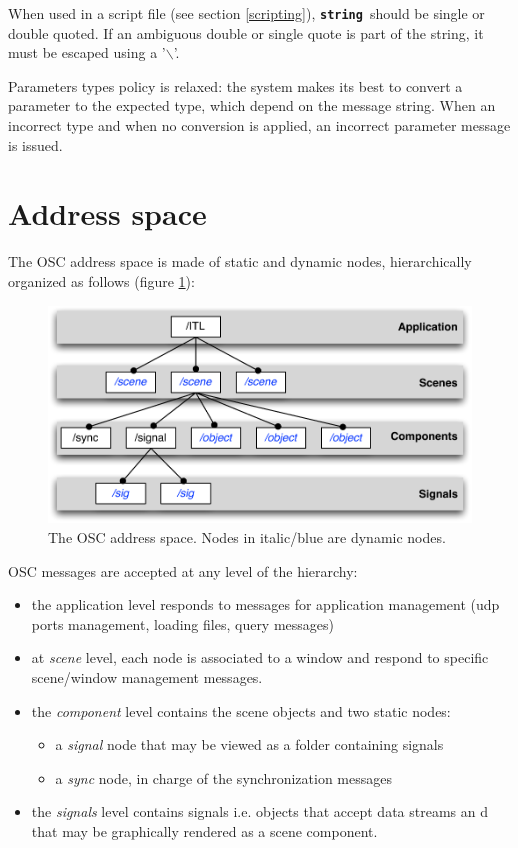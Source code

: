 \documentclass[a4paper,twoside]{report}
\newcommand{\sublevel}[1]	{\section{#1}}
\newcommand{\osctype}[1]{\textbf{\texttt{{\small #1}}}}
\newcommand{\oscstring}{\osctype{string}}
\begin{document}
When used in a script file (see section \ref{scripting}), \oscstring\ should be single or double quoted.
If an ambiguous double or single quote is part of the string, it must be escaped using a '$\backslash$'.

Parameters types policy is relaxed: the system makes its best to convert a parameter to the expected type, which depend on the message string. When an incorrect type and when no conversion is applied, an incorrect parameter message is issued.

\sublevel{Address space}
The OSC address space is made of static and dynamic nodes, hierarchically organized as follows (figure \ref{fig:addrspace}):

\begin{figure}[h]
	\centering \includegraphics[width=120mm]{imgs/address_space}
 \caption{The OSC address space. Nodes in italic/blue are dynamic nodes.}
 \label{fig:addrspace}
\end{figure}

OSC messages are accepted at any level of the hierarchy:
\begin{itemize}
\item the application level responds to messages for application management (udp ports management, loading files, query messages)
\item at \emph{scene} level, each node is associated to a window and respond to specific scene/window management messages.
\item the \emph{component} level contains the scene objects and two static nodes:

\begin{itemize}
\item a \emph{signal} node that may be viewed as a folder containing signals
\item a \emph{sync} node, in charge of the synchronization messages
\end{itemize}

\item the \emph{signals} level contains signals i.e. objects that accept data streams an d that may be graphically rendered as a scene component.

\end{itemize}
\end{document}
